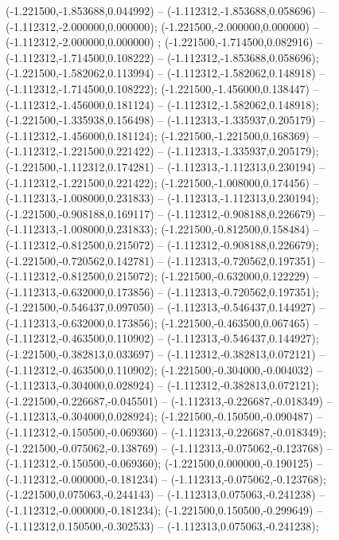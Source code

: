  (-1.221500,-1.853688,0.044992) -- (-1.112312,-1.853688,0.058696) -- (-1.112312,-2.000000,0.000000);
 (-1.221500,-2.000000,0.000000) -- (-1.112312,-2.000000,0.000000) ;
 (-1.221500,-1.714500,0.082916) -- (-1.112312,-1.714500,0.108222) -- (-1.112312,-1.853688,0.058696);
 (-1.221500,-1.582062,0.113994) -- (-1.112312,-1.582062,0.148918) -- (-1.112312,-1.714500,0.108222);
 (-1.221500,-1.456000,0.138447) -- (-1.112312,-1.456000,0.181124) -- (-1.112312,-1.582062,0.148918);
 (-1.221500,-1.335938,0.156498) -- (-1.112313,-1.335937,0.205179) -- (-1.112312,-1.456000,0.181124);
 (-1.221500,-1.221500,0.168369) -- (-1.112312,-1.221500,0.221422) -- (-1.112313,-1.335937,0.205179);
 (-1.221500,-1.112312,0.174281) -- (-1.112313,-1.112313,0.230194) -- (-1.112312,-1.221500,0.221422);
 (-1.221500,-1.008000,0.174456) -- (-1.112313,-1.008000,0.231833) -- (-1.112313,-1.112313,0.230194);
 (-1.221500,-0.908188,0.169117) -- (-1.112312,-0.908188,0.226679) -- (-1.112313,-1.008000,0.231833);
 (-1.221500,-0.812500,0.158484) -- (-1.112312,-0.812500,0.215072) -- (-1.112312,-0.908188,0.226679);
 (-1.221500,-0.720562,0.142781) -- (-1.112313,-0.720562,0.197351) -- (-1.112312,-0.812500,0.215072);
 (-1.221500,-0.632000,0.122229) -- (-1.112313,-0.632000,0.173856) -- (-1.112313,-0.720562,0.197351);
 (-1.221500,-0.546437,0.097050) -- (-1.112313,-0.546437,0.144927) -- (-1.112313,-0.632000,0.173856);
 (-1.221500,-0.463500,0.067465) -- (-1.112312,-0.463500,0.110902) -- (-1.112313,-0.546437,0.144927);
 (-1.221500,-0.382813,0.033697) -- (-1.112312,-0.382813,0.072121) -- (-1.112312,-0.463500,0.110902);
 (-1.221500,-0.304000,-0.004032) -- (-1.112313,-0.304000,0.028924) -- (-1.112312,-0.382813,0.072121);
 (-1.221500,-0.226687,-0.045501) -- (-1.112313,-0.226687,-0.018349) -- (-1.112313,-0.304000,0.028924);
 (-1.221500,-0.150500,-0.090487) -- (-1.112312,-0.150500,-0.069360) -- (-1.112313,-0.226687,-0.018349);
 (-1.221500,-0.075062,-0.138769) -- (-1.112313,-0.075062,-0.123768) -- (-1.112312,-0.150500,-0.069360);
 (-1.221500,0.000000,-0.190125) -- (-1.112312,-0.000000,-0.181234) -- (-1.112313,-0.075062,-0.123768);
 (-1.221500,0.075063,-0.244143) -- (-1.112313,0.075063,-0.241238) -- (-1.112312,-0.000000,-0.181234);
 (-1.221500,0.150500,-0.299649) -- (-1.112312,0.150500,-0.302533) -- (-1.112313,0.075063,-0.241238);
